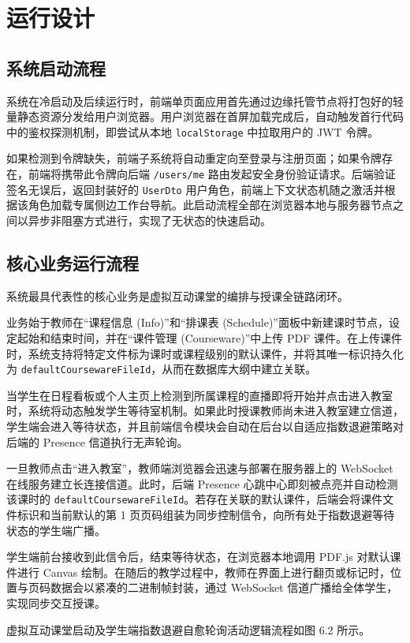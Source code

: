 \chapter{运行设计}

\section{系统启动流程}
系统在冷启动及后续运行时，前端单页面应用首先通过边缘托管节点将打包好的轻量静态资源分发给用户浏览器。用户浏览器在首屏加载完成后，自动触发首行代码中的鉴权探测机制，即尝试从本地 \texttt{localStorage} 中拉取用户的 JWT 令牌。

如果检测到令牌缺失，前端子系统将自动重定向至登录与注册页面；如果令牌存在，前端将携带此令牌向后端 \texttt{/users/me} 路由发起安全身份验证请求。后端验证签名无误后，返回封装好的 \texttt{UserDto} 用户角色，前端上下文状态机随之激活并根据该角色加载专属侧边工作台导航。此启动流程全部在浏览器本地与服务器节点之间以异步非阻塞方式进行，实现了无状态的快速启动。

\section{核心业务运行流程}
系统最具代表性的核心业务是虚拟互动课堂的编排与授课全链路闭环。

业务始于教师在“课程信息 (Info)”和“排课表 (Schedule)”面板中新建课时节点，设定起始和结束时间，并在“课件管理 (Courseware)”中上传 PDF 课件。在上传课件时，系统支持将特定文件标为课时或课程级别的默认课件，并将其唯一标识持久化为 \texttt{defaultCoursewareFileId}，从而在数据库大纲中建立关联。

当学生在日程看板或个人主页上检测到所属课程的直播即将开始并点击进入教室时，系统将动态触发学生等待室机制。如果此时授课教师尚未进入教室建立信道，学生端会进入等待状态，并且前端信令模块会自动在后台以自适应指数退避策略对后端的 Presence 信道执行无声轮询。

一旦教师点击“进入教室”，教师端浏览器会迅速与部署在服务器上的 WebSocket 在线服务建立长连接信道。此时，后端 Presence 心跳中心即刻被点亮并自动检测该课时的 \texttt{defaultCoursewareFileId}。若存在关联的默认课件，后端会将课件文件标识和当前默认的第 1 页页码组装为同步控制信令，向所有处于指数退避等待状态的学生端广播。

学生端前台接收到此信令后，结束等待状态，在浏览器本地调用 PDF.js 对默认课件进行 Canvas 绘制。在随后的教学过程中，教师在界面上进行翻页或标记时，位置与页码数据会以紧凑的二进制帧封装，通过 WebSocket 信道广播给全体学生，实现同步交互授课。

虚拟互动课堂启动及学生端指数退避自愈轮询活动逻辑流程如图 6.2 所示。

